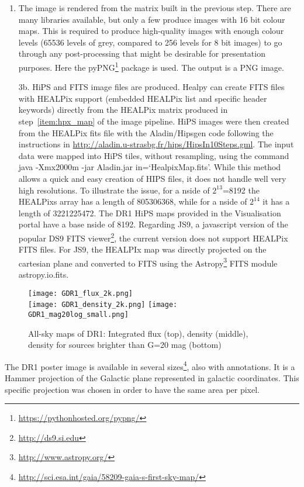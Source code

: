 \documentclass[longauth, final]{aa}
\begin{document}
\begin{enumerate}
    \item The image is rendered from the matrix built in the previous step. There are many libraries available, but only a few produce images with 16 bit colour maps. This is required to produce high-quality images with enough colour levels (65536 levels of grey, compared to 256 levels for 8 bit images) to go through any post-processing that might be desirable for presentation purposes. Here the pyPNG\footnote{\url{https://pythonhosted.org/pypng/}} package is used. The output is a PNG image.
 
    \item[3b.] HiPS and FITS image files are produced. Healpy can create FITS files with HEALPix support (embedded HEALPix list and specific header keywords) directly from the HEALPix matrix produced in step~\ref{item:hpx_map} of the image pipeline. HiPS images were then created from the HEALPix fits file with the Aladin/Hipsgen code following the instructions in  \url{http://aladin.u-strasbg.fr/hips/HipsIn10Steps.gml}. The input data were mapped into HiPS tiles, without resampling, using the command java -Xmx2000m -jar Aladin.jar in=`HealpixMap.fits'.  While this method allows a quick and easy creation of HIPS files, it does not handle well very high resolutions. To illustrate the issue, for a nside of $2^{13}$=8192 the HEALPixs array has a length of 805306368, while for a nside of  $2^{14}$ it has a length of 3221225472. The DR1 HiPS maps provided in the Visualisation portal have a base nside of 8192.
    Regarding JS9, a javascript version of the popular DS9 FITS viewer\footnote{\url{http://ds9.si.edu}}, the current version does not support HEALPix FITS files. For JS9, the HEALPIx map was directly projected on the cartesian plane and converted to FITS using the Astropy\footnote{\url{http://www.astropy.org/}} FITS module astropy.io.fits.
\end{enumerate}

\begin{figure*}[!htbp]
\centering
    \texttt{[image: GDR1\_flux\_2k.png]}\\
    \texttt{[image: GDR1\_density\_2k.png]}
    \texttt{[image: GDR1\_mag20log\_small.png]}
  \caption{All-sky maps of DR1: Integrated flux (top), density (middle), density for sources brighter than G=20 mag (bottom)}\label{fig:allsky}
\end{figure*}

The DR1 poster image \citep{2016A&A...595A...2G} is available in several sizes\footnote{\url{http://sci.esa.int/gaia/58209-gaia-s-first-sky-map/}}, also with annotations. It 
is a Hammer projection of the Galactic plane represented in galactic coordinates. This specific projection was chosen in order to have the same area per pixel. 
\end{document}
